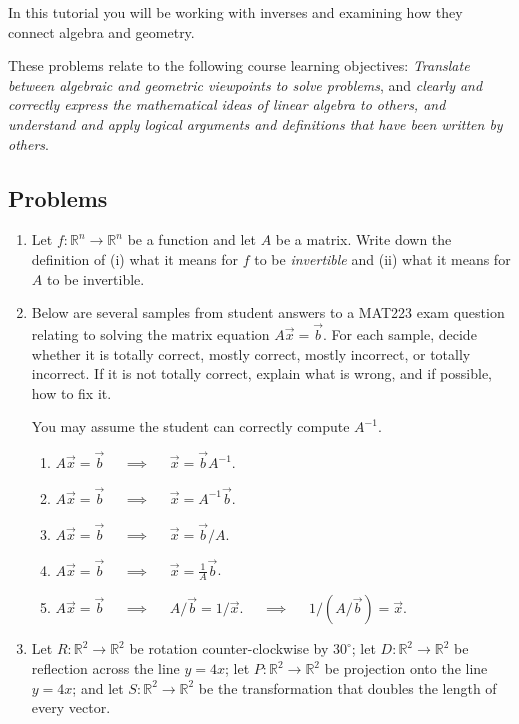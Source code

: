 \documentclass[red]{tutorial}
\newcommand{\R}{\mathbb{R}}
\theoremstyle{definition}
\theoremstyle{theorem}
\begin{document}
	\begin{tutorial}

		\begin{objectives}
	In this tutorial you will be working with inverses and examining how they connect algebra
			and geometry.

	These problems relate to the following course learning objectives:
			\textit{Translate between algebraic and geometric viewpoints to solve problems}, and
	\textit{clearly and correctly express the mathematical ideas of linear algebra to others, 
	and understand and apply logical arguments and definitions that have been written by others}.
		\end{objectives}


\subsection*{Problems}

	\begin{enumerate}
	\item Let $f:\R^n\to\R^n$ be a function and let $A$ be a matrix. Write down the definition of (i) what it means
		for $f$ to be \emph{invertible} and (ii) what it means for $A$ to be invertible.
	
	\item Below are several samples from student answers to a MAT223 exam question relating to solving the matrix equation
		$A\vec x=\vec b$. For each sample, decide whether it is totally correct, mostly correct, mostly incorrect, or 
		totally incorrect.
		If it is not totally correct, explain what is wrong, and if possible, how to fix it.

		You may assume the student can correctly compute $A^{-1}$.
		\begin{enumerate}
			\item $A\vec x=\vec b$ $\quad\implies\quad$ $\vec x=\vec bA^{-1}$.
			\item $A\vec x=\vec b$ $\quad\implies\quad$ $\vec x=A^{-1}\vec b$.
			\item $A\vec x=\vec b$ $\quad\implies\quad$ $\vec x=\vec b/A$.
			\item $A\vec x=\vec b$ $\quad\implies\quad$ $\vec x=\tfrac{1}{A}\vec b$.
			\item $A\vec x=\vec b$ $\quad\implies\quad$ $A/\vec b=1/\vec x$. $\quad\implies\quad$ $1/(A/\vec b)=\vec x$.
		\end{enumerate}

	\item Let $R:\R^2\to\R^2$ be rotation counter-clockwise by $30^\circ$; let $D:\R^2\to\R^2$ be reflection across the
		line $y=4x$; let $P:\R^2\to\R^2$ be projection onto the line $y=4x$; and let $S:\R^2\to\R^2$ be the transformation
			that doubles the length of every vector.


\end{enumerate}
\end{tutorial}
\end{document}
